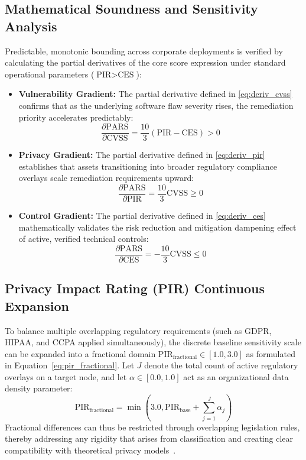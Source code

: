 \documentclass[conference,a4paper]{IEEEtran}
\begin{document}
\subsection{Mathematical Soundness and Sensitivity Analysis}
Predictable, monotonic bounding across corporate deployments is verified by calculating the partial derivatives of the core score expression under standard operational parameters ($\text{PIR} > \text{CES}$):
\begin{itemize}
    \item \textbf{Vulnerability Gradient:} The partial derivative defined in \eqref{eq:deriv_cvss} confirms that as the underlying software flaw severity rises, the remediation priority accelerates predictably:
    \begin{equation}
    \frac{\partial \text{PARS}}{\partial \text{CVSS}} = \frac{10}{3}(\text{PIR} - \text{CES}) > 0
    \label{eq:deriv_cvss}
    \end{equation}
    \item \textbf{Privacy Gradient:} The partial derivative defined in \eqref{eq:deriv_pir} establishes that assets transitioning into broader regulatory compliance overlays scale remediation requirements upward:
    \begin{equation}
    \frac{\partial \text{PARS}}{\partial \text{PIR}} = \frac{10}{3}\text{CVSS} \ge 0
    \label{eq:deriv_pir}
    \end{equation}
    \item \textbf{Control Gradient:} The partial derivative defined in \eqref{eq:deriv_ces} mathematically validates the risk reduction and mitigation dampening effect of active, verified technical controls:
    \begin{equation}
    \frac{\partial \text{PARS}}{\partial \text{CES}} = -\frac{10}{3}\text{CVSS} \le 0
    \label{eq:deriv_ces}
    \end{equation}
\end{itemize}
\subsection{Privacy Impact Rating (PIR) Continuous Expansion}
To balance multiple overlapping regulatory requirements (such as GDPR, HIPAA, and CCPA applied simultaneously), the discrete baseline sensitivity scale can be expanded into a fractional domain $\text{PIR}_{\text{fractional}} \in [1.0, 3.0]$ as formulated in Equation~\eqref{eq:pir_fractional}. Let $J$ denote the total count of active regulatory overlays on a target node, and let $\alpha \in [0.0, 1.0]$ act as an organizational data density parameter:
\begin{equation}
\text{PIR}_{\text{fractional}} = \min\left(3.0, \text{PIR}_{\text{base}} + \sum_{j=1}^{J} \alpha_j \right)
\label{eq:pir_fractional}
\end{equation}
Fractional differences can thus be restricted through overlapping legislation rules, thereby addressing any rigidity that arises from classification and creating clear compatibility with theoretical privacy models~\cite{b5}.
\end{document}
